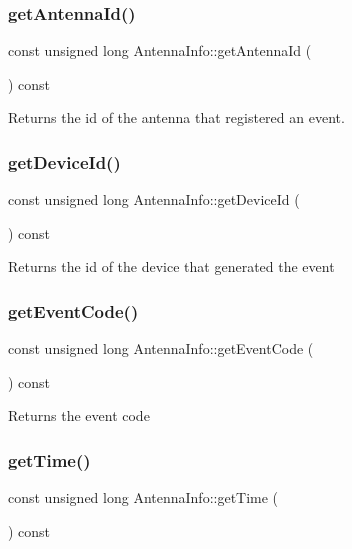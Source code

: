 \subsubsection{getAntennaId()}
{\footnotesize\ttfamily const unsigned long Antenna\+Info\+::get\+Antenna\+Id (\begin{DoxyParamCaption}{ }\end{DoxyParamCaption}) const}

\begin{DoxyReturn}{Returns}
the id of the antenna that registered an event. 
\end{DoxyReturn}
\mbox{\label{class_antenna_info_ae59a012bda35bb1ccfe1ff2c4038ac18}} 
\subsubsection{getDeviceId()}
{\footnotesize\ttfamily const unsigned long Antenna\+Info\+::get\+Device\+Id (\begin{DoxyParamCaption}{ }\end{DoxyParamCaption}) const}

\begin{DoxyReturn}{Returns}
the id of the device that generated the event 
\end{DoxyReturn}
\mbox{\label{class_antenna_info_a300f601af4e815890b385e661f43c335}} 
\subsubsection{getEventCode()}
{\footnotesize\ttfamily const unsigned long Antenna\+Info\+::get\+Event\+Code (\begin{DoxyParamCaption}{ }\end{DoxyParamCaption}) const}

\begin{DoxyReturn}{Returns}
the event code 
\end{DoxyReturn}
\mbox{\label{class_antenna_info_af773dd6039b87c97306a16a454c8faa9}} 
\subsubsection{getTime()}
{\footnotesize\ttfamily const unsigned long Antenna\+Info\+::get\+Time (\begin{DoxyParamCaption}{ }\end{DoxyParamCaption}) const}

